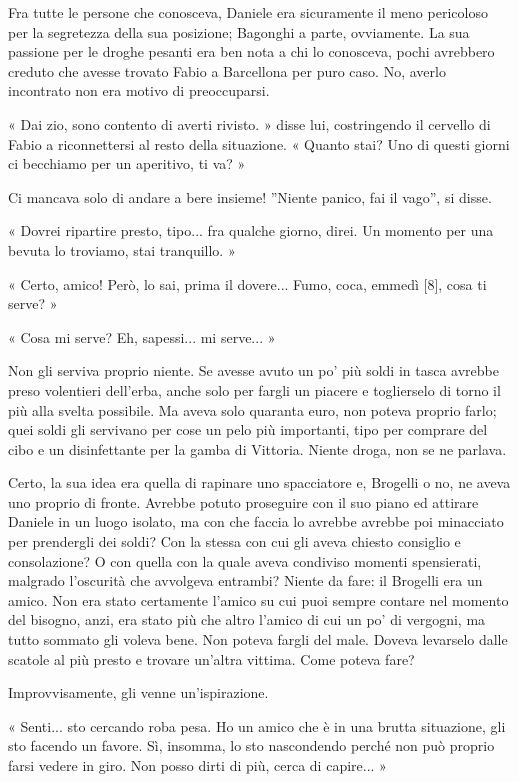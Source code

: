 Fra tutte le persone che conosceva, Daniele era sicuramente il meno pericoloso per la segretezza della sua posizione; Bagonghi a parte, ovviamente. La sua passione per le droghe pesanti era ben nota a chi lo conosceva, pochi avrebbero creduto che avesse trovato Fabio a Barcellona per puro caso. No, averlo incontrato non era motivo di preoccuparsi.

« Dai zio, sono contento di averti rivisto. » disse lui, costringendo il cervello di Fabio a riconnettersi al resto della situazione. « Quanto stai? Uno di questi giorni ci becchiamo per un aperitivo, ti va? »

Ci mancava solo di andare a bere insieme! ''Niente panico, fai il vago'', si disse.

« Dovrei ripartire presto, tipo... fra qualche giorno, direi. Un momento per una bevuta lo troviamo, stai tranquillo. »

« Certo, amico! Però, lo sai, prima il dovere... Fumo, coca, emmedì [8], cosa ti serve? »

« Cosa mi serve? Eh, sapessi... mi serve... »

Non gli serviva proprio niente. Se avesse avuto un po' più soldi in tasca avrebbe preso volentieri dell'erba, anche solo per fargli un piacere e toglierselo di torno il più alla svelta possibile. Ma aveva solo quaranta euro, non poteva proprio farlo; quei soldi gli servivano per cose un pelo più importanti, tipo per comprare del cibo e un disinfettante per la gamba di Vittoria. Niente droga, non se ne parlava.

Certo, la sua idea era quella di rapinare uno spacciatore e, Brogelli o no, ne aveva uno proprio di fronte. Avrebbe potuto proseguire con il suo piano ed attirare Daniele in un luogo isolato, ma con che faccia lo avrebbe avrebbe poi minacciato per prendergli dei soldi? Con la stessa con cui gli aveva chiesto consiglio e consolazione? O con quella con la quale aveva condiviso momenti spensierati, malgrado l'oscurità che avvolgeva entrambi? Niente da fare: il Brogelli era un amico. Non era stato certamente l'amico su cui puoi sempre contare nel momento del bisogno, anzi, era stato più che altro l'amico di cui un po' di vergogni, ma tutto sommato gli voleva bene. Non poteva fargli del male. Doveva levarselo dalle scatole al più presto e trovare un'altra vittima. Come poteva fare?

Improvvisamente, gli venne un'ispirazione.

« Senti... sto cercando roba pesa. Ho un amico che è in una brutta situazione, gli sto facendo un favore. Sì, insomma, lo sto nascondendo perché non può proprio farsi vedere in giro. Non posso dirti di più, cerca di capire... »

